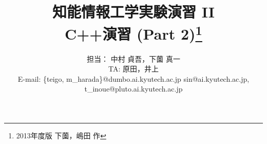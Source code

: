 %
%
\title{{\normalsize 知能情報工学実験演習 II }\\
\bf C++演習 (Part 2)\footnote{2013年度版 下薗，嶋田 作} }
\author{担当： 中村 貞吾，下薗 真一\\
TA: 原田，井上	\\
E-mail: \footnotesize
{\sf \{teigo, m\_harada\}@dumbo.ai.kyutech.ac.jp}
\footnotesize
{\sf sin@ai.kyutech.ac.jp},\\
\footnotesize
{\sf t\_inoue@pluto.ai.kyutech.ac.jp}}
\date{}
%
%
\def\linesparpage#1{\baselineskip=\textheight\divide\baselineskip#1}
\setcounter{execnumber}{0}
\newcommand{\EXERCISE}[1]{
 \refstepcounter{execnumber}
 \begin{center}
  \fbox{
   \begin{minipage}{\textwidth}
    \noindent
    {\bf 演習 \arabic{execnumber}}
    #1
   \end{minipage}
  }
 \end{center}
}
\setcounter{pntnumber}{0}
\newcommand{\POINT}[2]{
 \medskip
 \refstepcounter{pntnumber}
\noindent
■■■■■ {\sf Point \arabic{pntnumber}:} {\bf #1} \hrulefill ■ \\
{\small #2}

\noindent
■ \hrulefill ■■■■■ \\
 \medskip
}

\setlength{\textwidth}{165mm}       %
\setlength{\textheight}{255mm}      %
\setlength{\oddsidemargin}{-2mm}     %
\setlength{\evensidemargin}{0mm}    %
\setlength{\topmargin}{-20mm}         %

